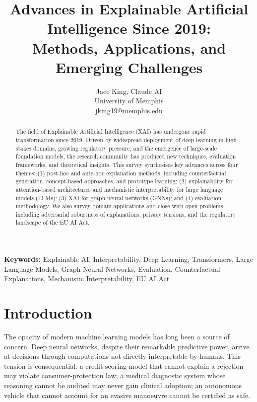 \documentclass[12pt]{article}
\begin{document}
\title{Advances in Explainable Artificial Intelligence Since 2019:\\
       Methods, Applications, and Emerging Challenges}
\author{Jace King, Claude AI\\{}University of Memphis\\{}jking19@memphis.edu}
\date{}
\maketitle

\begin{abstract}
The field of Explainable Artificial Intelligence (XAI) has undergone rapid
transformation since 2019. Driven by widespread deployment of deep learning in
high-stakes domains, growing regulatory pressure, and the emergence of large-scale
foundation models, the research community has produced new techniques, evaluation
frameworks, and theoretical insights. This survey synthesises key advances across
four themes: (1) post-hoc and ante-hoc explanation methods, including counterfactual
generation, concept-based approaches, and prototype learning; (2) explainability for
attention-based architectures and mechanistic interpretability for large language
models (LLMs); (3) XAI for graph neural networks (GNNs); and (4) evaluation
methodology. We also survey domain applications and close with open problems
including adversarial robustness of explanations, privacy tensions, and the
regulatory landscape of the EU AI Act.
\end{abstract}

\noindent\textbf{Keywords:} Explainable AI, Interpretability, Deep Learning,
Transformers, Large Language Models, Graph Neural Networks, Evaluation,
Counterfactual Explanations, Mechanistic Interpretability, EU AI Act

\section{Introduction}
\label{sec:intro}

The opacity of modern machine learning models has long been a source of concern.
Deep neural networks, despite their remarkable predictive power, arrive at
decisions through computations not directly interpretable by humans. This tension
is consequential: a credit-scoring model that cannot explain a rejection may
violate consumer-protection law; a medical diagnostic system whose reasoning
cannot be audited may never gain clinical adoption; an autonomous vehicle that
cannot account for an evasive manoeuvre cannot be certified as safe.
\end{document}
